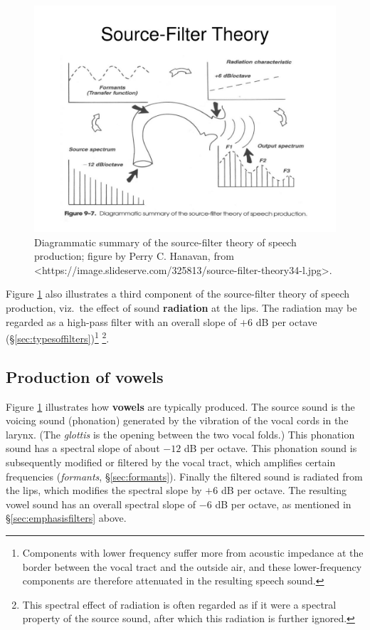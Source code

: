\documentclass[
]{book}
\begin{document}
\begin{figure}

{\centering \includegraphics{figures/source-filter-theory34-l} 

}

\caption{Diagrammatic summary of the source-filter theory of speech production; figure by Perry C. Hanavan, from <https://image.slideserve.com/325813/source-filter-theory34-l.jpg>.}\label{fig:source-filter}
\end{figure}

Figure \ref{fig:source-filter} also illustrates a third component of the source-filter theory of speech production, viz.~the effect of sound \textbf{radiation} at the lips. The radiation may be regarded as a high-pass filter with an overall slope of \(+6\) dB per octave (§\ref{sec:typesoffilters})\footnote{Components with lower frequency suffer more from acoustic impedance at the border between the vocal tract and the outside air, and these lower-frequency components are therefore attenuated in the resulting speech sound.} \footnote{This spectral effect of radiation is often regarded as if it were a spectral property of the source sound, after which this radiation is further ignored.}.

\subsection{Production of vowels}\label{sec:vowelproduction}

Figure \ref{fig:source-filter} illustrates how \textbf{vowels} are typically produced. The source sound is the voicing sound (phonation) generated by the vibration of the vocal cords in the larynx. (The \emph{glottis} is the opening between the two vocal folds.) This phonation sound has a spectral slope of about \(-12\) dB per octave. This phonation sound is subsequently modified or filtered by the vocal tract, which amplifies certain frequencies (\emph{formants}, §\ref{sec:formants}). Finally the filtered sound is radiated from the lips, which modifies the spectral slope by \(+6\) dB per octave. The resulting vowel sound has an overall spectral slope of \(-6\) dB per octave, as mentioned in §\ref{sec:emphasisfilters} above.
\end{document}

